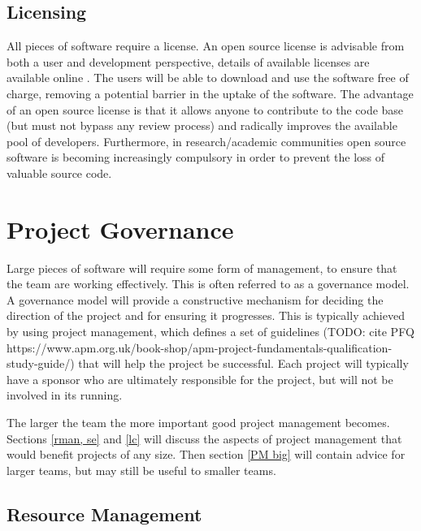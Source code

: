 \documentclass[jnr]{iosart2x}
\begin{document}
\subsection{Licensing}
\label{Licensing}

All pieces of software require a license.
An open source license is advisable from both a user and development perspective, details of available licenses are available online \cite{OSI_Licenses}.
The users will be able to download and use the software free of charge, removing a potential barrier in the uptake of the software.
The advantage of an open source license is that it allows anyone to contribute to the code base (but must not bypass any review process) and radically improves the available pool of developers.
Furthermore, in research/academic communities open source software is becoming increasingly compulsory in order to prevent the loss of valuable source code.

\section{Project Governance}
\label{Project Governance}

Large pieces of software will require some form of management, to ensure that the team are working effectively.
This is often referred to as a governance model.
A governance model will provide a constructive mechanism for deciding the direction of the project and for ensuring it progresses.
This is typically achieved by using project management, which defines a set of guidelines (TODO: cite PFQ https://www.apm.org.uk/book-shop/apm-project-fundamentals-qualification-study-guide/) that will help the project be successful.
Each project will typically have a sponsor who are ultimately responsible for the project, but will not be involved in its running.

The larger the team the more important good project management becomes.
Sections \ref{rman, se} and \ref{lc} will discuss the aspects of project management that would benefit projects of any size.
Then section \ref{PM big} will contain advice for larger teams, but may still be useful to smaller teams.

\subsection{Resource Management}
\label{rman}
\end{document}
